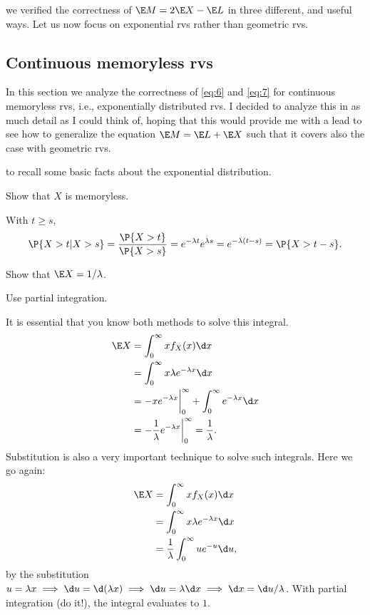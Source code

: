\documentclass[a4paper]{article}
\begin{document}
 we verified the correctness of \(\E M = 2\E X - \E L\) in three different, and useful ways. Let us now focus on exponential rvs rather than geometric rvs.
\subsection{Continuous memoryless rvs}
\label{sec:org0bba81d}
\label{sec:exerc-expon-distr}

In this section we analyze the correctness of \cref{eq:6} and  \cref{eq:7} for continuous memoryless rvs, i.e., exponentially distributed rvs.
I decided to analyze this in as much detail as I could think of, hoping that this would provide me with a lead to see how to generalize the equation \(\E M = \E L + \E X\) such that it covers also the case with  geometric rvs.



 to recall some basic facts about the exponential distribution.

\begin{exercise}
Show that \(X\) is memoryless.
\begin{solution}
With \(t \geq s\),
\begin{equation*}
\P{X>t|X>s} = \frac{\P{X>t}}{\P{X>s}} = e^{-\lambda t} e^{\lambda s} = e^{-\lambda(t-s)} = \P{X>t - s}.
\end{equation*}
\end{solution}
\end{exercise}


\begin{exercise}
Show that \(\E X = 1/\lambda\).
\begin{hint}
Use partial integration.
\end{hint}
\begin{solution}
It is essential that  you know both methods to solve this integral.
  \begin{align*}
\E X
&= \int_{0}^{\infty}  x f_{X}(x) \d x  \\
&= \int_{0}^{\infty}  x \lambda e^{-\lambda x} \d x  \\
&= - xe^{-\lambda x} \biggr|_{0}^{\infty} + \int_{0}^{\infty}  e^{-\lambda x} \d x  \\
&=  - \frac 1 \lambda e^{-\lambda x} \biggr|_{0}^{\infty} = \frac 1 \lambda.
  \end{align*}
Substitution is also a very important technique to solve such integrals. Here we go again:
  \begin{align*}
\E X
&= \int_{0}^{\infty}  x f_{X}(x) \d x  \\
&= \int_{0}^{\infty}  x \lambda e^{-\lambda x} \d x  \\
&= \frac 1 \lambda \int_{0}^{\infty}  u  e^{- u} \d u,
  \end{align*}
by the substitution \(u=\lambda x \implies \d u = \d (\lambda x) \implies \d u = \lambda \d x \implies \d x = \d u / \lambda\).
With partial integration (do it!), the integral evaluates to \(1\).
\end{solution}
\end{exercise}
\end{document}
